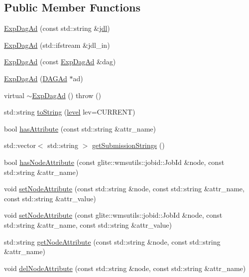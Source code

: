 \subsection*{Public Member Functions}
\begin{CompactItemize}
\item 
\hyperlink{classglite_1_1wms_1_1jdl_1_1ExpDagAd_a0}{Exp\-Dag\-Ad} (const std::string \&\hyperlink{classjdl}{jdl})
\item 
\hyperlink{classglite_1_1wms_1_1jdl_1_1ExpDagAd_a1}{Exp\-Dag\-Ad} (std::ifstream \&jdl\_\-in)
\item 
\hyperlink{classglite_1_1wms_1_1jdl_1_1ExpDagAd_a2}{Exp\-Dag\-Ad} (const \hyperlink{classglite_1_1wms_1_1jdl_1_1ExpDagAd}{Exp\-Dag\-Ad} \&dag)
\item 
\hyperlink{classglite_1_1wms_1_1jdl_1_1ExpDagAd_a3}{Exp\-Dag\-Ad} (\hyperlink{classglite_1_1wms_1_1jdl_1_1DAGAd}{DAGAd} $\ast$ad)
\item 
virtual \hyperlink{classglite_1_1wms_1_1jdl_1_1ExpDagAd_a4}{$\sim$Exp\-Dag\-Ad} ()  throw ()
\item 
std::string \hyperlink{classglite_1_1wms_1_1jdl_1_1ExpDagAd_a5}{to\-String} (\hyperlink{classglite_1_1wms_1_1jdl_1_1ExpDagAd_w11}{level} lev=CURRENT)
\item 
bool \hyperlink{classglite_1_1wms_1_1jdl_1_1ExpDagAd_a6}{has\-Attribute} (const std::string \&attr\_\-name)
\item 
std::vector$<$ std::string $>$ \hyperlink{classglite_1_1wms_1_1jdl_1_1ExpDagAd_a7}{get\-Submission\-Strings} ()
\item 
bool \hyperlink{classglite_1_1wms_1_1jdl_1_1ExpDagAd_a8}{has\-Node\-Attribute} (const glite::wmsutils::jobid::Job\-Id \&node, const std::string \&attr\_\-name)
\item 
void \hyperlink{classglite_1_1wms_1_1jdl_1_1ExpDagAd_a9}{set\-Node\-Attribute} (const std::string \&node, const std::string \&attr\_\-name, const std::string \&attr\_\-value)
\item 
void \hyperlink{classglite_1_1wms_1_1jdl_1_1ExpDagAd_a10}{set\-Node\-Attribute} (const glite::wmsutils::jobid::Job\-Id \&node, const std::string \&attr\_\-name, const std::string \&attr\_\-value)
\item 
std::string \hyperlink{classglite_1_1wms_1_1jdl_1_1ExpDagAd_a11}{get\-Node\-Attribute} (const std::string \&node, const std::string \&attr\_\-name)
\item 
void \hyperlink{classglite_1_1wms_1_1jdl_1_1ExpDagAd_a12}{del\-Node\-Attribute} (const std::string \&node, const std::string \&attr\_\-name)

\end{CompactItemize}

